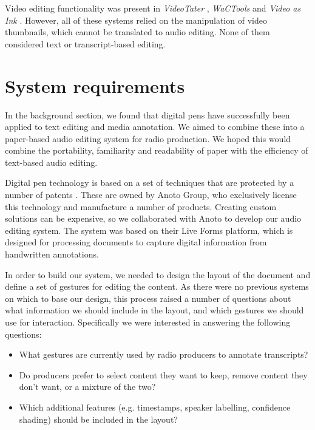 Video editing functionality was present in \textit{VideoTater} \citep{Diakopoulos2006}, \textit{WaCTools}
\citep{Cattelan2008} and \textit{Video as Ink} \citep{Cabral2016}. However, all of these systems relied on the
manipulation of video thumbnails, which cannot be translated to audio editing. None of them considered text or
transcript-based editing.



\section{System requirements}\label{sec:paper-requirements}

In the background section, we found that digital pens have successfully been applied to text editing and media
annotation. We aimed to combine these into a paper-based audio editing system for radio production. We hoped this
would combine the portability, familiarity and readability of paper with the efficiency of text-based audio editing. 

Digital pen technology is based on a set of techniques that are protected by a number of patents \citep{Fahraeus2003}.
These are owned by Anoto Group, who exclusively license this technology and manufacture a number of products. Creating
custom solutions can be expensive, so we collaborated with Anoto to develop our audio editing system. The system was
based on their Live Forms platform, which is designed for processing documents to capture digital information from
handwritten annotations.

In order to build our system, we needed to design the layout of the document and define a set of gestures for
editing the content.  As there were no previous systems on which to base our design, this process raised a number of
questions about what information we should include in the layout, and which gestures we should use for interaction.
Specifically we were interested in answering the following questions:

{\singlespacing
\begin{itemize}
  \item What gestures are currently used by radio producers to annotate transcripts?
  \item Do producers prefer to select content they want to keep, remove content they don't want, or a mixture of the
    two?
  \item Which additional features (e.g. timestamps, speaker labelling, confidence shading) should be included in the
    layout?
\end{itemize}
}


